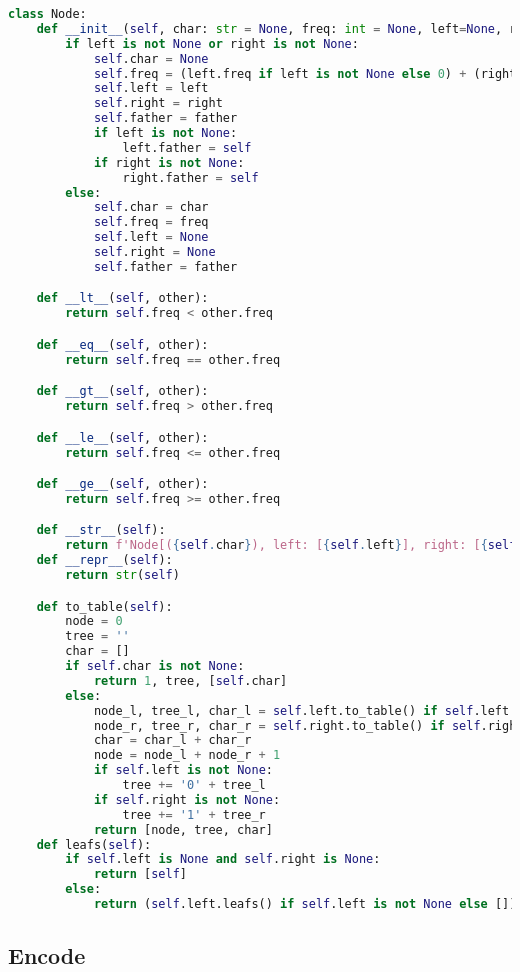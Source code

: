 \begin{lstlisting}[language=Python]
class Node:
    def __init__(self, char: str = None, freq: int = None, left=None, right=None, father=None):
        if left is not None or right is not None:
            self.char = None
            self.freq = (left.freq if left is not None else 0) + (right.freq if right is not None else 0)
            self.left = left
            self.right = right
            self.father = father
            if left is not None:
                left.father = self
            if right is not None:
                right.father = self
        else:
            self.char = char
            self.freq = freq
            self.left = None
            self.right = None
            self.father = father

    def __lt__(self, other):
        return self.freq < other.freq

    def __eq__(self, other):
        return self.freq == other.freq

    def __gt__(self, other):
        return self.freq > other.freq

    def __le__(self, other):
        return self.freq <= other.freq

    def __ge__(self, other):
        return self.freq >= other.freq

    def __str__(self):
        return f'Node[({self.char}), left: [{self.left}], right: [{self.right}]]'
    def __repr__(self):
        return str(self)

    def to_table(self):
        node = 0
        tree = ''
        char = []
        if self.char is not None:
            return 1, tree, [self.char]
        else:
            node_l, tree_l, char_l = self.left.to_table() if self.left is not None else (0, '', [])
            node_r, tree_r, char_r = self.right.to_table() if self.right is not None else (0, '', [])
            char = char_l + char_r
            node = node_l + node_r + 1
            if self.left is not None:
                tree += '0' + tree_l
            if self.right is not None:
                tree += '1' + tree_r
            return [node, tree, char]
    def leafs(self):
        if self.left is None and self.right is None:
            return [self]
        else:
            return (self.left.leafs() if self.left is not None else []) + (self.right.leafs() if self.right is not None else [])
\end{lstlisting}

\subsection{Encode}

